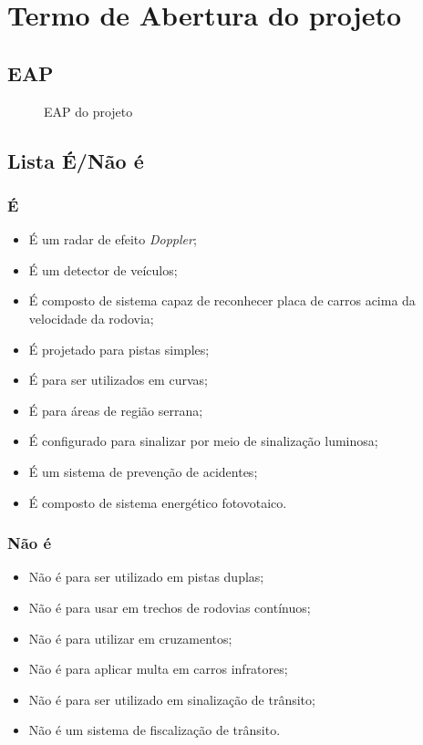 \chapter{Termo de Abertura do projeto}

\section{EAP}
\begin{figure}[!htb]
    \caption{\label{fig:eap} EAP do projeto}
\end{figure}
\section{Lista É/Não é}
\subsection{É}

\begin{itemize}
	\item É um radar de efeito \textit{Doppler};
	\item É um detector de veículos;
	\item É composto de sistema capaz de reconhecer placa de carros acima da velocidade da rodovia;
	\item É projetado para pistas simples;
	\item É para ser utilizados em curvas;
	\item É para áreas de região serrana;
	\item É configurado para sinalizar por meio de sinalização luminosa;
	\item É um sistema de prevenção de acidentes;
	\item É composto de sistema energético fotovotaico.
\end{itemize}
\subsection{Não é}

\begin{itemize}
	\item Não é para ser utilizado em pistas duplas;
	\item Não é para usar em trechos de rodovias contínuos;
	\item Não é para utilizar em cruzamentos;
	\item Não é para aplicar multa em carros infratores;
	\item Não é para ser utilizado em sinalização de trânsito;
	\item Não é um sistema de fiscalização de trânsito.
\end{itemize}

